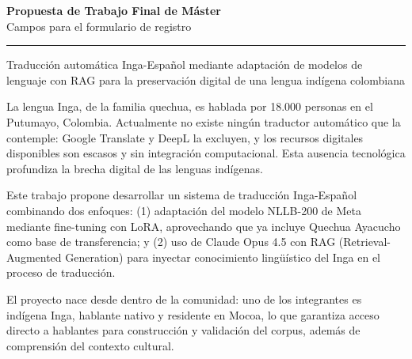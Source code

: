 \documentclass[11pt,a4paper]{article}
\begin{document}
\begin{center}
{\LARGE \textbf{Propuesta de Trabajo Final de Máster}}\\[0.3cm]
{\large Campos para el formulario de registro}\\[0.5cm]
\hrule
\end{center}

\vspace{0.8cm}

\begin{campo}
Traducción automática Inga-Español mediante adaptación de modelos de lenguaje con RAG para la preservación digital de una lengua indígena colombiana
\end{campo}

\vspace{0.5cm}

\begin{campo}
La lengua Inga, de la familia quechua, es hablada por 18.000 personas en el Putumayo, Colombia. Actualmente no existe ningún traductor automático que la contemple: Google Translate y DeepL la excluyen, y los recursos digitales disponibles son escasos y sin integración computacional. Esta ausencia tecnológica profundiza la brecha digital de las lenguas indígenas.

Este trabajo propone desarrollar un sistema de traducción Inga-Español combinando dos enfoques: (1) adaptación del modelo NLLB-200 de Meta mediante fine-tuning con LoRA, aprovechando que ya incluye Quechua Ayacucho como base de transferencia; y (2) uso de Claude Opus 4.5 con RAG (Retrieval-Augmented Generation) para inyectar conocimiento lingüístico del Inga en el proceso de traducción.

El proyecto nace desde dentro de la comunidad: uno de los integrantes es indígena Inga, hablante nativo y residente en Mocoa, lo que garantiza acceso directo a hablantes para construcción y validación del corpus, además de comprensión del contexto cultural.
\end{campo}

\vspace{0.5cm}
\end{document}
